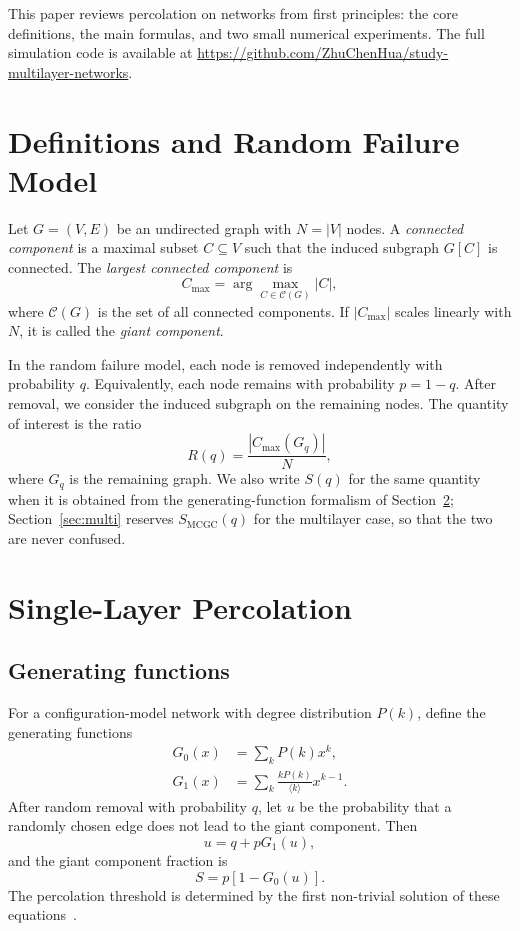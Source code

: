 \documentclass[11pt]{article}
\begin{document}
This paper reviews percolation on networks from first principles: the core definitions, the main formulas, and two small numerical experiments. The full simulation code is available at \url{https://github.com/ZhuChenHua/study-multilayer-networks}.

\section{Definitions and Random Failure Model}
Let $G=(V,E)$ be an undirected graph with $N=|V|$ nodes. A \emph{connected component} is a maximal subset $C\subseteq V$ such that the induced subgraph $G[C]$ is connected. The \emph{largest connected component} is
\begin{equation}
  C_{\max} = \arg\max_{C\in \mathcal{C}(G)} |C|,
\end{equation}
where $\mathcal{C}(G)$ is the set of all connected components. If $|C_{\max}|$ scales linearly with $N$, it is called the \emph{giant component}.

In the random failure model, each node is removed independently with probability $q$. Equivalently, each node remains with probability $p=1-q$. After removal, we consider the induced subgraph on the remaining nodes. The quantity of interest is the ratio
\begin{equation}
  R(q) = \frac{|C_{\max}(G_q)|}{N},
\end{equation}
where $G_q$ is the remaining graph. We also write $S(q)$ for the same quantity when it is obtained from the generating-function formalism of Section~\ref{sec:single}; Section~\ref{sec:multi} reserves $S_{\mathrm{MCGC}}(q)$ for the multilayer case, so that the two are never confused.

\section{Single-Layer Percolation}\label{sec:single}
\subsection{Generating functions}
For a configuration-model network with degree distribution $P(k)$, define the generating functions
\begin{equation}
\begin{aligned}
  G_0(x)&=\sum_k P(k)x^k,\\
  G_1(x)&=\sum_k \frac{kP(k)}{\langle k\rangle}x^{k-1}.
\end{aligned}
\end{equation}
After random removal with probability $q$, let $u$ be the probability that a randomly chosen edge does not lead to the giant component. Then
\begin{equation}
  u = q + p G_1(u),
\end{equation}
and the giant component fraction is
\begin{equation}
  S = p[1-G_0(u)].
\end{equation}
The percolation threshold is determined by the first non-trivial solution of these equations~\cite{newman2010}.
\end{document}
